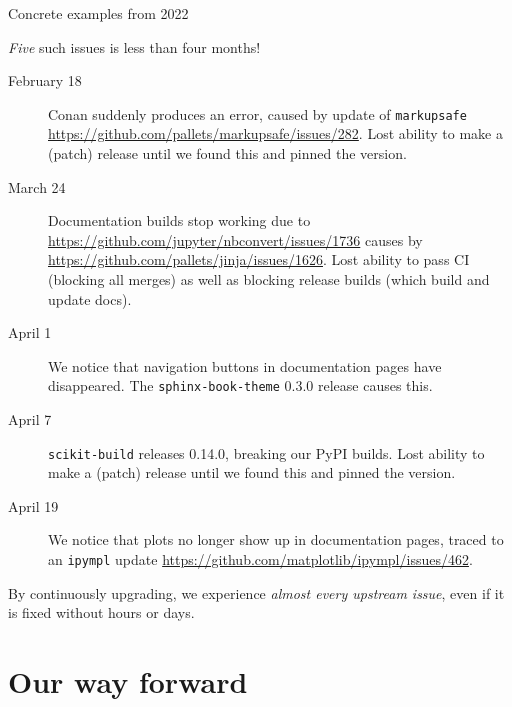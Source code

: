 \documentclass[english,aspectratio=1610,smaller]{beamer}
\begin{document}
\begin{frame}[fragile]{Concrete examples from 2022}
  \begin{block}{\emph{Five} such issues is less than four months!}
    \begin{description}
      \item[February 18] Conan suddenly produces an error, caused by update of \texttt{markupsafe} \url{https://github.com/pallets/markupsafe/issues/282}.
        Lost ability to make a (patch) release until we found this and pinned the version.
      \item[March 24] Documentation builds stop working due to \url{https://github.com/jupyter/nbconvert/issues/1736} causes by \url{https://github.com/pallets/jinja/issues/1626}.
        Lost ability to pass CI (blocking all merges) as well as blocking release builds (which build and update docs).
      \item[April 1] We notice that navigation buttons in documentation pages have disappeared. The \texttt{sphinx-book-theme} 0.3.0 release causes this.
      \item[April 7] \texttt{scikit-build} releases 0.14.0, breaking our PyPI builds.
        Lost ability to make a (patch) release until we found this and pinned the version.
      \item[April 19] We notice that plots no longer show up in documentation pages, traced to an \texttt{ipympl} update \url{https://github.com/matplotlib/ipympl/issues/462}.
    \end{description}
  \end{block}
  By continuously upgrading, we experience \emph{almost every upstream issue}, even if it is fixed without hours or days.
\end{frame}

\section{Our way forward}
\end{document}
